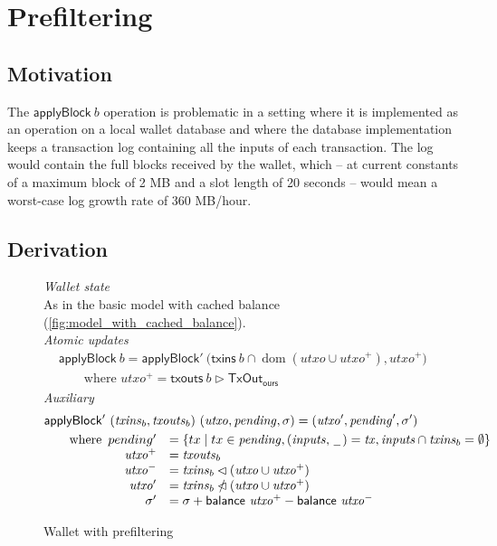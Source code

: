 \documentclass{article}
\newcommand{\restrictdom}{\lhd}
\newcommand{\subtractdom}{\mathbin{\slashed{\restrictdom}}}
\newcommand{\restrictrange}{\rhd}
\DeclareMathOperator{\dom}{dom}
\theoremstyle{definition}{
  \newtheorem{lemma}{Lemma}[section] %
  \newtheorem{definition}[lemma]{Definition}
}
\theoremstyle{theorem}{
  \newtheorem{invariant}[lemma]{Invariant}
  \newtheorem{proofobligation}[lemma]{Proof Obligation}
}
\numberwithin{equation}{lemma}
\begin{document}
\section{Prefiltering}
\label{sec:prefiltering}

\subsection{Motivation}

The $\mathsf{applyBlock} ~ b$ operation is problematic in a setting where it is
implemented as an operation on a local wallet database and where the database
implementation keeps a transaction log containing all the inputs of each
transaction. The log would contain the full blocks received
by the wallet, which -- at current constants of a maximum block of 2 MB and a slot
length of 20 seconds -- would mean a worst-case log growth rate of 360 MB/hour.

\subsection{Derivation}

\begin{figure}[p]
%
\emph{Wallet state} \\

As in the basic model with cached balance (\cref{fig:model_with_cached_balance}).  \\

\emph{Atomic updates}
%
\begin{align*}
& \mathsf{applyBlock} ~ b
  = \mathsf{applyBlock}' ~ \Big( \mathsf{txins} ~ b \cap \dom (\mathit{utxo} \cup \mathit{utxo}^+), \mathit{utxo}^+ \Bigr) \\
& \qquad \text{where~} \mathit{utxo}^+ = \mathsf{txouts} ~ b \restrictrange \mathsf{TxOut_{ours}}
\end{align*}
%
\emph{Auxiliary}
%
\begin{align*}
& \mathsf{applyBlock'} ~ (\mathit{txins}_b, \mathit{txouts}_b) ~ (\mathit{utxo}, \mathit{pending}, \sigma) = (\mathit{utxo}^\prime, \mathit{pending}^\prime, \sigma^\prime) \\
& \qquad \text{where}
   \begin{array}[t]{rl}
     pending^\prime & = \{ tx \mid tx \in \mathit{pending}, (\mathit{inputs}, \,\underline{\phantom{a}}\,) = \mathit{tx}, \mathit{inputs} \cap \mathit{txins}_b = \emptyset \} \\
     \mathit{utxo}^+ & = \mathit{txouts}_b \\
     \mathit{utxo}^- & = \mathit{txins}_b \restrictdom (\mathit{utxo} \cup \mathit{utxo}^+) \\
     \mathit{utxo}^\prime & = \mathit{txins}_b \subtractdom (\mathit{utxo} \cup \mathit{utxo}^+) \\
     \sigma^\prime & = \sigma + \mathsf{balance} ~ \mathit{utxo}^+ - \mathsf{balance} ~ \mathit{utxo}^-
   \end{array}
\end{align*}

\caption{\label{fig:wallet_with_prefiltering}Wallet with prefiltering}
\end{figure}
\end{document}
